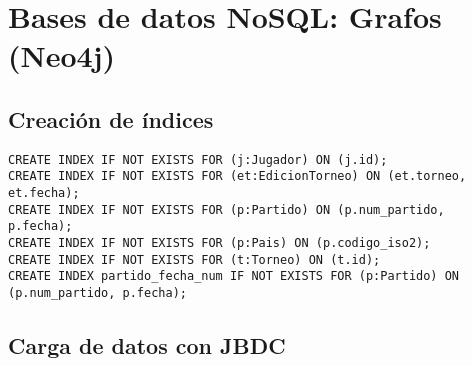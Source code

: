 \section{Bases de datos NoSQL: Grafos (Neo4j)}

\subsection{Creación de índices}

\begin{lstlisting}[language=Cypher]
CREATE INDEX IF NOT EXISTS FOR (j:Jugador) ON (j.id);
CREATE INDEX IF NOT EXISTS FOR (et:EdicionTorneo) ON (et.torneo, et.fecha);
CREATE INDEX IF NOT EXISTS FOR (p:Partido) ON (p.num_partido, p.fecha);
CREATE INDEX IF NOT EXISTS FOR (p:Pais) ON (p.codigo_iso2);
CREATE INDEX IF NOT EXISTS FOR (t:Torneo) ON (t.id);
CREATE INDEX partido_fecha_num IF NOT EXISTS FOR (p:Partido) ON (p.num_partido, p.fecha);
\end{lstlisting}

\subsection{Carga de datos con JBDC}

